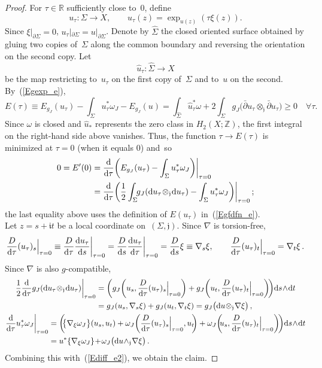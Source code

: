 \documentclass[11pt]{article}
\numberwithin{equation}{section}
\theoremstyle{definition}
\def\BE#1{\begin{equation}\label{#1}}
\def\EE{\end{equation}}
\def\eref#1{(\ref{#1})}
\def\wh#1{\widehat{#1}}
\def\lra{\longrightarrow}
\def\fI{\mathfrak i}
\def\fj{\mathfrak j}
\def\R{\mathbb R}
\def\Z{{\mathbb Z}}
\def\na{\nabla}
\def\om{\omega}
\def\Si{\Sigma}
\def\prt{\partial}
\def\dbar{\bar\partial}
\def\w{\wedge}
\def\nd{\textnormal{d}}
\begin{document}
\begin{proof} For $\tau\!\in\!\R$ sufficiently close to~0, define
$$u_{\tau}\!:\Si\lra X, \qquad u_{\tau}(z)\!=\!\exp_{u(z)}(\tau\xi(z)).$$
Since $\xi|_{\prt\Si}\!=\!0$, $u_{\tau}|_{\prt\Si}\!=\!u|_{\prt\Si}$. 
Denote by $\wh\Si$ the closed oriented surface obtained by gluing two copies of~$\Si$
along the common boundary and reversing the orientation on the second copy.
Let
$$\wh{u}_{\tau}\!: \wh\Si\lra X$$
be the map restricting to~$u_{\tau}$ on the first copy of~$\Si$
and to~$u$ on the second.\\

\noindent
By~\eref{Egexp_e}, 
$$E(\tau)\equiv E_{g_J}(u_{\tau})-\int_{\Si}u_{\tau}^*\om_J-E_{g_J}(u)
=\int_{\wh\Si}\wh{u}_{\tau}^*\om+
2\int_{\Si}g_J\big(\dbar u_{\tau}\!\otimes_{\fj}\!\dbar u_{\tau}\big)
\ge0\quad\forall\tau.$$
Since $\om$ is closed and $\wh{u}_*$ represents the zero class in $H_2(X;\Z)$,
the first integral on the right-hand side above vanishes.
Thus, the function \hbox{$\tau\!\lra\!E(\tau)$}
is minimized at $\tau\!=\!0$ (when it equals 0) and~so  
\BE{Ediff_e2}\begin{split}
0=E'(0)
&=\frac{\nd}{\nd\tau}\bigg(E_{g_J}(u_{\tau})
-\int_{\Si}u_{\tau}^*\om_J\bigg)\bigg|_{\tau=0}\\
&=\frac{\nd}{\nd\tau}\bigg(
\frac12\int_{\Si}\!\!g_J(\nd u_{\tau}\!\otimes_{\fj}\!\nd u_{\tau})
-\int_{\Si}u_{\tau}^*\om_J\bigg)\bigg|_{\tau=0}\,;
\end{split}\EE
the last equality above uses the definition of $E(u_{\tau})$ in~\eref{Egfdfn_e}.\\

\noindent
Let $z\!=\!s\!+\!\fI t$ be a local coordinate on~$(\Si,\fj)$.
Since $\na$ is torsion-free, 
$$\frac{D}{\nd\tau}(u_{\tau})_s\Big|_{\tau=0}
\equiv\frac{D}{\nd\tau}\frac{\nd u_{\tau}}{\nd s}\bigg|_{\tau=0}
=\frac{D}{\nd s}\frac{\nd u_{\tau}}{\nd\tau}\bigg|_{\tau=0}
=\frac{D}{\nd s}\xi\equiv\na_s\xi, \qquad
\frac{D}{\nd\tau}(u_{\tau})_t\Big|_{\tau=0}=\na_t\xi\,.$$
Since $\na$ is also $g$-compatible, 
\begin{gather*}\begin{split}
\frac12\frac{\nd}{\nd\tau}g_J(\nd u_{\tau}\!\otimes_{\fj}\!\nd u_{\tau})
\bigg|_{\tau=0}
&=\bigg(g_J\bigg(u_s,\frac{D}{\nd\tau}(u_{\tau})_s\Big|_{\tau=0}\bigg)
+g_J\bigg(u_t,\frac{D}{\nd\tau}(u_{\tau})_t\Big|_{\tau=0}\bigg)\!\bigg)
\nd s\!\w\!\nd t\\
&=g_J(u_s,\na_s\xi)+g_J(u_t,\na_t\xi)
=g_J\big(\nd u\!\otimes_{\fj}\!\na\xi\big)\,,
\end{split}\\
\begin{split}
\frac{\nd}{\nd\tau}u_{\tau}^*\om_J\bigg|_{\tau=0}
&=\bigg(\!\!\big\{\na_{\xi}\om_J\big\}(u_s,u_t)+
\om_J\bigg(\frac{D}{\nd\tau}(u_{\tau})_s\Big|_{\tau=0},u_t\!\!\bigg)
+\om_J\bigg(\!\!u_s,\frac{D}{\nd\tau}(u_{\tau})_t\Big|_{\tau=0}\bigg)\!\bigg)
\nd s\!\w\!\nd t\\
&=u^*\{\na_{\xi}\om_J\}\!+\!\om_J\big(\nd u\!\w_{\fj}\!\na\xi\big)\,.
\end{split}\end{gather*}
Combining this with~\eref{Ediff_e2}, we obtain the claim.
\end{proof}
\end{document}
